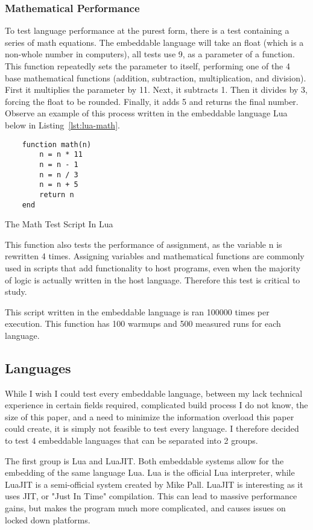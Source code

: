 \subsubsection{Mathematical Performance}
To test language performance at the purest form, there is a test containing a series of math equations. The embeddable language will take an float (which is a non-whole number in computers), all tests use 9, as a parameter of a function. This function repeatedly sets the parameter to itself, performing one of the 4 base mathematical functions (addition, subtraction, multiplication, and division). First it multiplies the parameter by 11. Next, it subtracts 1. Then it divides by 3, forcing the float to be rounded. Finally, it adds 5 and returns the final number. Observe an example of this process written in the embeddable language Lua below in Listing~\ref{lst:lua-math}.

\begin{listing}[H]
    \begin{verbatim}
    function math(n)
        n = n * 11
        n = n - 1
        n = n / 3
        n = n + 5
        return n
    end
    \end{verbatim}
    \caption{The Math Test Script In Lua}
    \label{lst:lua-math}
\end{listing}

This function also tests the performance of assignment, as the variable n is rewritten 4 times. Assigning variables and mathematical functions are commonly used in scripts that add functionality to host programs, even when the majority of logic is actually written in the host language. Therefore this test is critical to study.

This script written in the embeddable language is ran 100000 times per execution. This function has 100 warmups and 500 measured runs for each language.

\subsection{Languages}
While I wish I could test every embeddable language, between my lack technical experience in certain fields required, complicated build process I do not know, the size of this paper, and a need to minimize the information overload this paper could create, it is simply not feasible to test every language. I therefore decided to test 4 embeddable languages that can be separated into 2 groups.

The first group is Lua\cite{lua} and LuaJIT\cite{luaJIT}. Both embeddable systems allow for the embedding of the same language Lua. Lua is the official Lua interpreter, while LuaJIT is a semi-official system created by Mike Pall. LuaJIT is interesting as it uses JIT, or "Just In Time" compilation. This can lead to massive performance gains, but makes the program much more complicated, and causes issues on locked down platforms.

